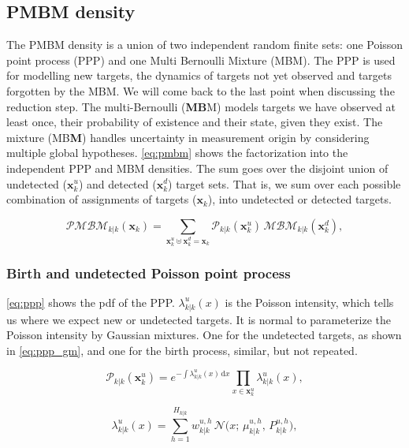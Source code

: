 \subsection{PMBM density}
The PMBM density is a union of two independent random finite sets: one Poisson point process (PPP) and one Multi Bernoulli Mixture (MBM). The PPP is used for modelling new targets, the dynamics of targets not yet observed and targets forgotten by the MBM. We will come back to the last point when discussing the reduction step. The multi-Bernoulli (\textbf{MB}M) models targets we have observed at least once, their probability of existence and their state, given they exist. The mixture (MB\textbf{M}) handles uncertainty in measurement origin by considering multiple global hypotheses. \autoref{eq:pmbm} shows the factorization into the independent PPP and MBM densities. The sum goes over the disjoint union of undetected ($\mathbf{x}^u_k$) and detected ($\mathbf{x}^d_k$) target sets. That is, we sum over each possible combination of assignments of targets ($\mathbf{x}_k$), into undetected or detected targets.

\begin{equation}
  \mathcal{PMBM}_{k|k}(\mathbf{x}_k) = \sum_{\mathbf{x}^u_k \uplus \mathbf{x}^d_k = \mathbf{x}_k} \mathcal{P}_{k|k}(\mathbf{x}^u_k)\, \mathcal{MBM}_{k|k}(\mathbf{x}^d_k),
  \label{eq:pmbm}
\end{equation}
\medskip

\subsubsection{Birth and undetected Poisson point process}
\autoref{eq:ppp} shows the pdf of the PPP. $\lambda^u_{k|k}(x)$ is the Poisson intensity, which tells us where we expect new or undetected targets. It is normal to parameterize the Poisson intensity by Gaussian mixtures. One for the undetected targets, as shown in \autoref{eq:ppp_gm}, and one for the birth process, similar, but not repeated.

\begin{equation}
  \mathcal{P}_{k|k}(\mathbf{x}^u_k) = e^{-\int \lambda^u_{k|k}(x)\,\mathrm{d}x} \prod_{x \in \mathbf{x}^u_k} \lambda^u_{k|k}(x),
  \label{eq:ppp}
\end{equation}

\begin{equation}
  \lambda^u_{k|k}(x) = \sum_{h=1}^{H_{k|k}} w^{u,h}_{k|k}\, \mathcal{N}\big(x;\, \mu^{u,h}_{k|k},\, P^{u,h}_{k|k}\big),
  \label{eq:ppp_gm}
\end{equation}

